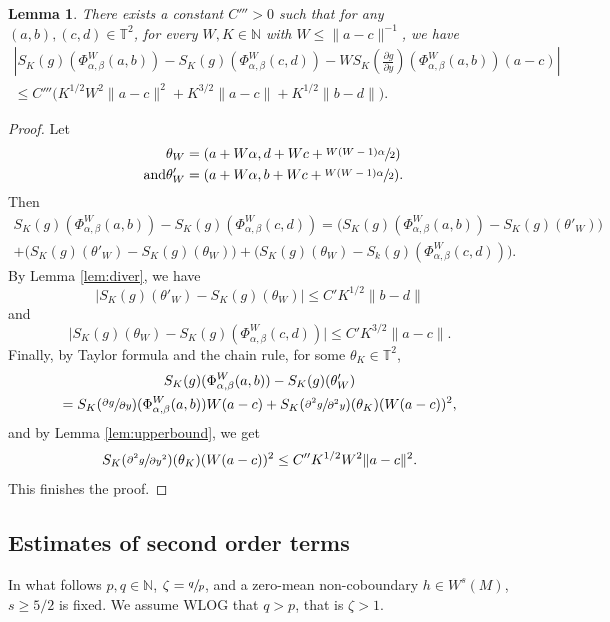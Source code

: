 \documentclass[JEP,XML,SOM,Unicode,NoEqCountersInSection]{cedram}
\theoremstyle{definition}
\theoremstyle{plain}
\newtheorem{lemma}[definition]{Lemma}
\newcommand\NN{\mathbb{N}}
\newcommand\TT{\mathbb{T}}
\begin{document}
\begin{lemma}\label{lem:span}
There exists a constant $C'''>0$ such that for any $(a,b),(c,d)\in \TT^2$, for every $W,K\in \NN$ with $W\leq \|a-c\|^{-1}$, we have
\begin{multline*}
|S_K(g)(\Phi_{\alpha,\beta}^W(a,b))-S_K(g)(\Phi_{\alpha,\beta}^{W}(c,d))-WS_K(\frac{\partial g}{\partial y})(\Phi_{\alpha,\beta}^W(a,b))(a-c)| \\
\leq C'''\bigl(K^{1/2}W^2\|a-c\|^2 + K^{3/2}\|a-c\|+K^{1/2}\|b-d\|\bigr).
\end{multline*}
\end{lemma}
\begin{proof}Let
\begin{align*}
\theta_W&=(a+W\alpha, d+Wc+\sfrac{W(W-1)\alpha}{2})\\
\tag*{and}
\theta'_{W}&=(a+W\alpha,b+Wc+\sfrac{W(W-1)\alpha}{2}).
\end{align*}
Then
\begin{multline*}
S_K(g)(\Phi_{\alpha,\beta}^W(a,b))-S_K(g)(\Phi_{\alpha,\beta}^{W}(c,d))=
\bigl(S_K(g)(\Phi_{\alpha,\beta}^W(a,b))-S_K(g)(\theta'_W)\bigr)\\
+\bigl(S_K(g)(\theta'_W)-S_K(g)(\theta_W)\bigr)+
\bigl(S_K(g)(\theta_W)-S_k(g)(\Phi_{\alpha,\beta}^W(c,d))\bigr).
\end{multline*}
By Lemma \ref{lem:diver}, we have
\[
\bigl|S_K(g)(\theta'_W)-S_K(g)(\theta_W)\bigr|\leq C'K^{1/2}\|b-d\|
\]
and
\[
\bigl|S_K(g)(\theta_W)-S_K(g)(\Phi_{\alpha,\beta}^W(c,d))\bigr|\leq C'K^{3/2}\|a-c\|.
\]
Finally, by Taylor formula and the chain rule, for some $\theta_K\in \TT^2$,
\begin{multline*}
S_K(g)(\Phi_{\alpha,\beta}^W(a,b))-S_K(g)(\theta'_W) \\=S_K(\sfrac{\partial g}{\partial y})(\Phi_{\alpha,\beta}^W(a,b))W(a-c)+S_K(\sfrac{\partial^2 g}{\partial^2 y})(\theta_K)(W(a-c))^2,
\end{multline*}
and by Lemma \ref{lem:upperbound}, we get
\[
S_K(\sfrac{\partial^2 g}{\partial y^2})(\theta_K)(W(a-c))^2\leq C''
K^{1/2}W^2\|a-c\|^2.
\]
This finishes the proof.
\end{proof}

\subsection{Estimates of second order terms}

In what follows $p,q\in \NN$, $\zeta=\sfrac{q}{p}$, and a zero-mean non-coboundary $h\in W^s(M)$, $s\geq 5/2$ is fixed. We assume WLOG that $q>p$, that is $\zeta>1$.
\end{document}

